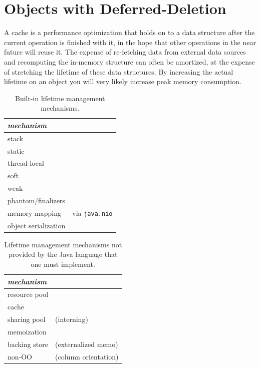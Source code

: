 \section{Objects with Deferred-Deletion}
\label{deferred-deletion}

A cache is a performance optimization that holds on to a data structure after the
current operation is finished with it, in the hope that other operations in the
near future will reuse it. The expense of re-fetching data from external data
sources and recomputing the in-memory structure can often be amortized, at the
expense of stretching the lifetime of these data structures. By increasing the
actual lifetime on an object you will very likely increase peak memory
consumption.





\begin{table}
\centering
\begin{tabular}{|l|l|} \hline
\em mechanism & \\ \hline \hline
stack & \\ \hline 
static & \\ \hline
thread-local & \\ \hline
soft & \\ \hline
weak & \\ \hline
phantom/finalizers & \\ \hline
memory mapping & via \texttt{java.nio} \\ \hline 
object serialization & \\ \hline
\end{tabular}
\caption{Built-in lifetime management mechanisms.}
\label{tab:builtin-lifetime-management}
\end{table}

\begin{table}
\centering
\begin{tabular}{|l|l|} \hline
\em mechanism & \\ \hline \hline
resource pool & \\ \hline
cache & \\ \hline
sharing pool & (interning)\\ \hline
memoization & \\ \hline
backing store &(externalized memo) \\ \hline
non-OO & (column orientation) \\ \hline 
\end{tabular}
\caption{Lifetime management mechanisms not provided by the Java language that one must implement.}
\label{tab:software-lifetime-management}
\end{table}




